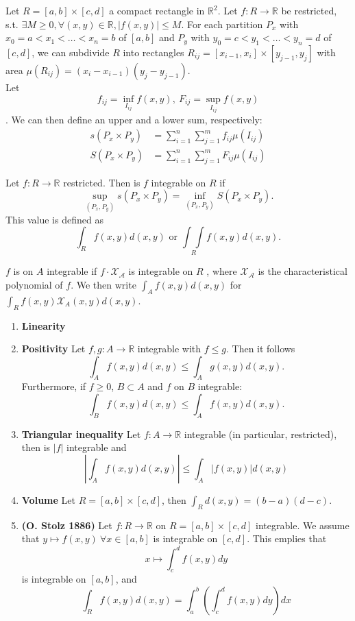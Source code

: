 \documentclass[10pt,landscape, a4paper]{article}
\newcommand{\custombox}[3]{\begin{tcolorbox}[left=0mm,right=0mm,bottom=0mm,top=0mm,title = \textbf{#1}, colback=#2!10!white, colframe = #2!70!white, coltitle=white, breakable]
    #3
    \end{tcolorbox}}
\newcommand{\definition}[2]{\custombox{Definition #1}{red}{#2}}
\newcommand{\other}[2]{\custombox{#1}{green!60!black}{#2}}
\newcommand{\R}{\mathbb{R}}
\begin{document}
\begin{multicols*}{3}
    \definition{Integral on a rectangle}{
    Let $R = [a,b]\times [c,d]$ a compact rectangle in $\R^2$. Let $f:R \to \R$  be restricted, s.t. $\exists M \geqslant 0, \forall (x,y)\in \R, |f(x,y)|\leqslant M$.
    For each partition $P_x$ with $x_0 = a<x_1<\dots <x_n=b$ of $[a,b]$ and $P_y$ with $y_0 = c < y_1 < \dots <y_n = d$ of $[c,d]$, we can subdivide $R$ into rectangles $R_{ij} = [x_{i-1},x_i]\times [y_{j-1},y_j]$ with area $\mu(R_{ij}) = (x_i-x_{i-1})(y_j-y_{j-1})$.\\
    Let $$f_{ij} = \inf_{I_{ij}}f(x,y),\ F_{ij} = \sup_{I_{ij}}f(x,y)$$.
    We can then define an upper and a lower sum, respectively:
    \begin{align*}
        s(P_x\times P_y) & = \sum_{i=1}^n \sum_{j=1}^m f_{ij}\mu(I_{ij}) \\
        S(P_x\times P_y) & = \sum_{i=1}^n \sum_{j=1}^m F_{ij}\mu(I_{ij})
    \end{align*}
    }

    \definition{Riemann integrable in $\R^2$}{
        Let $f: R\to \R$ restricted. Then is $f$ integrable on $R$ if $$\sup_{(P_x,P_y)} s(P_x\times P_y)=\inf_{(P_x,P_y)}  S(P_x\times P_y).$$
        This value is defined as $$
            \int_Rf(x,y)d(x,y) \text{ or } \underset{R}{\int \int} f(x,y)d(x,y).
        $$
    }

    \definition{Riemann integrable and characteristical funciton}{
        $f$ is on $A$ integrable if $f\cdot \mathcal{X_A}$ is integrable on $R$ , where $\mathcal{X_A}$ is the characteristical polynomial of $f$. We then write $\int_A f(x,y)d(x,y)$ for $\int_R f(x,y) \mathcal{X}_A(x,y)d(x,y)$.
    }

    \other{Riemann integral's properties}{
        \begin{enumerate}[label=(\arabic*)]
            \item \textbf{Linearity}
            \item \textbf{Positivity} Let $f,g: A \to \R$ integrable with $f\leqslant g$. Then it follows $$\int_Af(x,y)d(x,y) \leqslant \int_Ag(x,y)d(x,y).$$ Furthermore, if $f\geqslant 0$, $B\subset A$ and $f$ on $B$ integrable:$$\int_Bf(x,y)d(x,y) \leqslant \int_Af(x,y)d(x,y).$$
            \item \textbf{Triangular inequality} Let $f:A\to \R$ integrable (in particular, restricted), then is $|f|$ integrable and $$\left|\int_Af(x,y)d(x,y)\right|\leqslant \int_A\left|f(x,y)\right|d(x,y)$$ 
            \item \textbf{Volume} Let $R = [a,b]\times [c,d]$, then $\int_Rd(x,y) = (b-a)(d-c)$.
            \item \textbf{(O. Stolz 1886)}  Let $f:R\to \R$ on $R = [a,b]\times [c,d]$ integrable. We assume that $y\mapsto f(x,y)\ \forall x\in[a,b]$ is integrable on $[c,d]$. This emplies that $$ x\mapsto \int_c^df(x,y)dy$$ is integrable on $[a,b]$, and $$\int_R f(x,y)d(x,y) = \int_a^b\left(\int_c^df(x,y)dy\right)dx$$
        \end{enumerate}
    }
        

\end{multicols*}
\end{document}
